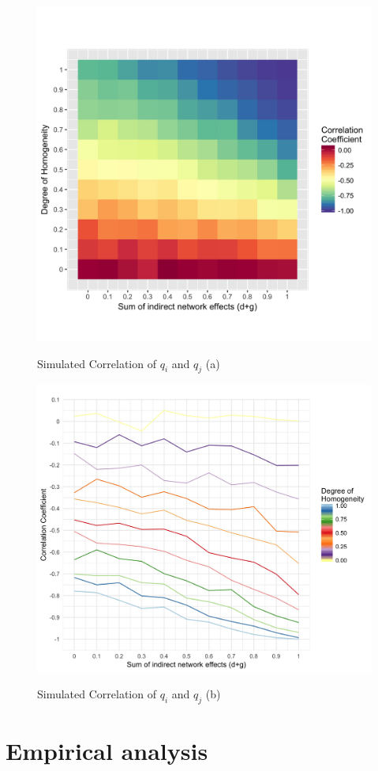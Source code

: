 \documentclass[12pt,a4paper,notitlepage]{article}
\begin{document}
\begin{figure}[H]
	\centering
	\caption{Simulated Correlation of $q_i$ and $q_j$ (a)}
	\includegraphics[width=.7\textwidth]{../figs/qqmatrix}
	\label{fig_QQa}
\end{figure}

\begin{figure}[H]
	\centering
	\caption{Simulated Correlation of $q_i$ and $q_j$ (b)}
	\includegraphics[width=.7\textwidth]{../figs/qqplot}
	\label{fig_QQb}
\end{figure}


\section{Empirical analysis}\label{empirical}
\end{document}
